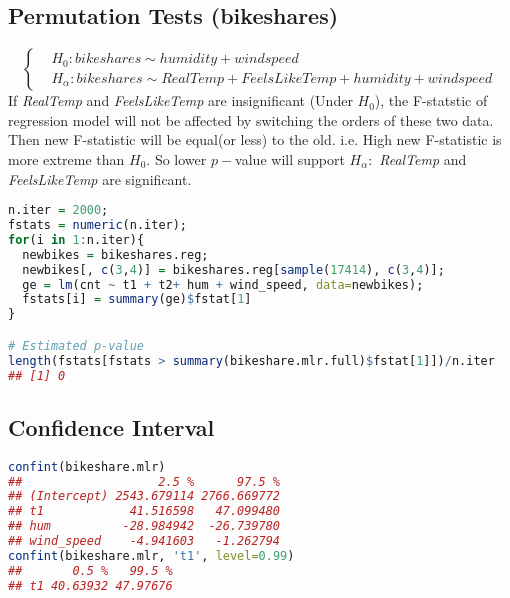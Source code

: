 \documentclass[11pt,a4paper]{article}
\begin{document}
\subsection{Permutation Tests (bikeshares)}
\[\begin{cases}
    &H_0: bikeshares \sim humidity + windspeed\\
    &H_{\alpha}: bikeshares \sim RealTemp + FeelsLikeTemp + humidity + windspeed
    \end{cases}\]
If \textit{RealTemp} and \textit{FeelsLikeTemp} are insignificant (Under $H_0$), the F-statstic of regression model will not be affected by switching the orders of these two data. Then new F-statistic will be equal(or less) to the old. i.e. High new F-statistic is more extreme than $H_0$. So lower $p-$value will support $H_\alpha:$ \textit{RealTemp} and \textit{FeelsLikeTemp} are significant.
\begin{lstlisting}[language=R]
n.iter = 2000;
fstats = numeric(n.iter);
for(i in 1:n.iter){
  newbikes = bikeshares.reg;
  newbikes[, c(3,4)] = bikeshares.reg[sample(17414), c(3,4)];
  ge = lm(cnt ~ t1 + t2+ hum + wind_speed, data=newbikes);
  fstats[i] = summary(ge)$fstat[1]
}

# Estimated p-value
length(fstats[fstats > summary(bikeshare.mlr.full)$fstat[1]])/n.iter
## [1] 0
\end{lstlisting}

\subsection{Confidence Interval}
\begin{lstlisting}[language=R]
confint(bikeshare.mlr)
##                   2.5 %      97.5 %
## (Intercept) 2543.679114 2766.669772
## t1            41.516598   47.099480
## hum          -28.984942  -26.739780
## wind_speed    -4.941603   -1.262794
confint(bikeshare.mlr, 't1', level=0.99)
##       0.5 %   99.5 %
## t1 40.63932 47.97676
\end{lstlisting}
\end{document}
